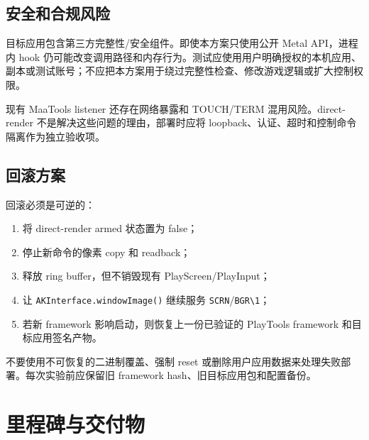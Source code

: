 \documentclass[UTF8,a4paper,11pt]{ctexart}
\begin{document}
\subsection{安全和合规风险}

目标应用包含第三方完整性/安全组件。即使本方案只使用公开 Metal API，进程内 hook 仍可能改变调用路径和内存行为。测试应使用用户明确授权的本机应用、副本或测试账号；不应把本方案用于绕过完整性检查、修改游戏逻辑或扩大控制权限。

现有 MaaTools listener 还存在网络暴露和 TOUCH/TERM 混用风险。direct-render 不是解决这些问题的理由，部署时应将 loopback、认证、超时和控制命令隔离作为独立验收项。

\subsection{回滚方案}

回滚必须是可逆的：

\begin{enumerate}
  \item 将 direct-render armed 状态置为 false；
  \item 停止新命令的像素 copy 和 readback；
  \item 释放 ring buffer，但不销毁现有 PlayScreen/PlayInput；
  \item 让 \texttt{AKInterface.windowImage()} 继续服务 \texttt{SCRN}/\texttt{BGR\textbackslash{}1}；
  \item 若新 framework 影响启动，则恢复上一份已验证的 PlayTools framework 和目标应用签名产物。
\end{enumerate}

不要使用不可恢复的二进制覆盖、强制 reset 或删除用户应用数据来处理失败部署。每次实验前应保留旧 framework hash、旧目标应用包和配置备份。

\section{里程碑与交付物}
\end{document}
